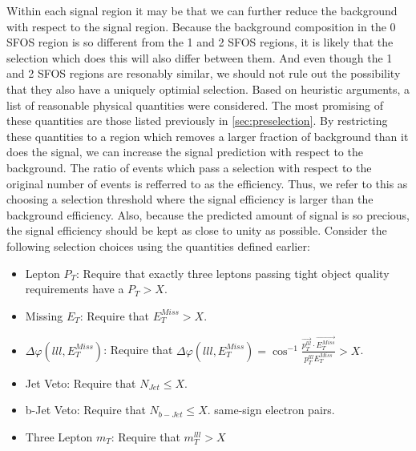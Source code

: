 Within each signal region it may be that we can further reduce the 
background with respect to the signal region. 
Because the background composition in the 0 SFOS region
is so different from the 1 and 2 SFOS regions, it is likely that
the selection which does this will also differ between them. 
And even though the
1 and 2 SFOS regions are resonably similar, we should not rule out
the possibility that they also have a uniquely optimial selection.
Based on heuristic arguments, a list of reasonable physical
quantities were considered. The most promising of these quantities
are those listed previously in \sec\ref{sec:preselection}. 
By restricting these quantities to a region which removes a larger
fraction of background than it does the signal, we can 
increase the signal prediction with respect to the background.
The ratio of events which pass a selection with respect
to the original number of events is refferred to as the 
efficiency.
Thus, we refer to this as choosing a selection threshold where 
the signal efficiency is larger than the background efficiency.
Also, because the predicted amount of signal is so precious,
the signal efficiency should be kept as close to unity as possible.
Consider the following selection choices using the quantities defined
earlier:
\begin{itemize}
\item Lepton $P_{T}$:  Require that exactly three leptons passing tight object quality requirements have a $P_{T} > X$.
\item Missing $E_{T}$:  Require that $E_{T}^{Miss} > X$.
\item $\Delta\varphi(lll,E_{T}^{Miss})$:  Require that $\Delta\varphi(lll,E_{T}^{Miss}) = \cos^{-1}\frac{ \overrightarrow{p_{T}^{lll}}\cdot\overrightarrow{E_{T}^{Miss}} }{ p_{T}^{lll}E_{T}^{Miss} } > X$.
\item Jet Veto: Require that $N_{Jet} \leq X$.
\item b-Jet Veto: Require that $N_{b-Jet} \leq X$.
same-sign electron pairs.
\item Three Lepton $m_{T}$: Require that $m_{T}^{lll} > X$
\end{itemize}

